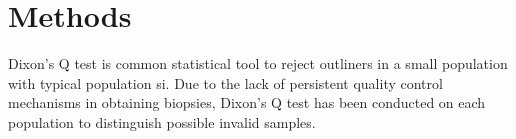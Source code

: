 \chapter{Methods}

Dixon's Q test is common statistical tool to reject outliners in a small population with typical population si. Due to the lack of persistent quality control mechanisms in obtaining biopsies, Dixon's Q test has been conducted on each population to distinguish possible invalid samples. 